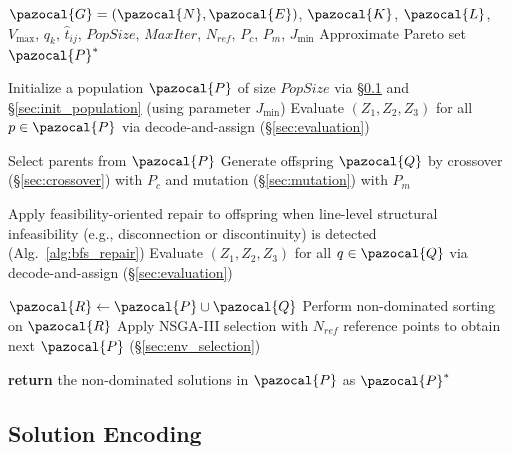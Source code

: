 \documentclass[a4paper,fleqn]{cas-sc}
\begin{document}
\begin{algorithm}[htbp]
\small
\caption{NSGA-III based Adaptive PT Network Optimization}
\label{alg:NSGA3}
\begin{algorithmic}[1]
    \renewcommand{\algorithmicrequire}{\textbf{Input:}}
    \renewcommand{\algorithmicensure}{\textbf{Output:}}
    
    \REQUIRE $\pazocal{G}=(\pazocal{N}, \pazocal{E})$, $\pazocal{K}$, $\pazocal{L}$, $V_{\max}$, $q_k$, $\hat{t}_{ij}$, $\textit{PopSize}$, $\textit{MaxIter}$, $N_{\textit{ref}}$, $P_c$, $P_m$, $J_{\min}$
    \ENSURE Approximate Pareto set $\pazocal{P}^*$
    
    \STATE Initialize a population $\pazocal{P}$ of size $\textit{PopSize}$ via \S\ref{sec:encoding} and \S\ref{sec:init_population} (using parameter $J_\text{min}$) \label{line:initialization}
    \STATE Evaluate $(Z_1, Z_2, Z_3)$ for all $p \in \pazocal{P}$ via decode-and-assign (\S\ref{sec:evaluation}) \label{line:eval_init}
    
        \STATE Select parents from $\pazocal{P}$ \label{line:parent_selection}
        \STATE Generate offspring $\pazocal{Q}$ by crossover (\S\ref{sec:crossover}) with $P_c$ and mutation (\S\ref{sec:mutation}) with $P_m$ \label{line:variation}
        
        \STATE Apply feasibility-oriented repair to offspring when line-level structural infeasibility (e.g., disconnection or discontinuity) is detected (Alg.~\ref{alg:bfs_repair})
        \STATE Evaluate $(Z_1, Z_2, Z_3)$ for all $q \in \pazocal{Q}$ via decode-and-assign (\S\ref{sec:evaluation}) \label{line:evaluation}
        
        \STATE $\pazocal{R} \gets \pazocal{P} \cup \pazocal{Q}$
        \STATE Perform non-dominated sorting on $\pazocal{R}$ \label{line:nd_sort}
        \STATE Apply NSGA-III selection with $N_{\textit{ref}}$ reference points to obtain next $\pazocal{P}$ (\S\ref{sec:env_selection}) \label{line:env_select}
    \ENDFOR
    
    \STATE \textbf{return} the non-dominated solutions in $\pazocal{P}$ as $\pazocal{P}^*$
\end{algorithmic}
\end{algorithm}
\FloatBarrier
\subsection{Solution Encoding}\label{sec:encoding}
\end{document}
